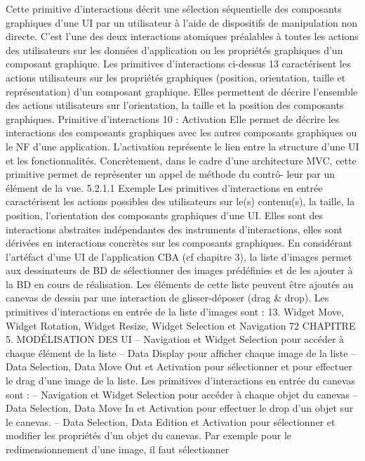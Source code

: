 \documentclass{article}
\begin{document}
Cette primitive d’interactions décrit une sélection séquentielle des composants graphiques d’une UI
par un utilisateur à l’aide de dispositifs de manipulation non directe. C’est l’une des deux interactions
atomiques préalables à toutes les actions des utilisateurs sur les données d’application ou les propriétés
graphiques d’un composant graphique.
Les primitives d’interactions ci-dessus 13 caractérisent les actions utilisateurs sur les propriétés
graphiques (position, orientation, taille et représentation) d’un composant graphique. Elles permettent
de décrire l’ensemble des actions utilisateurs sur l’orientation, la taille et la position des composants
graphiques.
Primitive d’interactions 10 : Activation
Elle permet de décrire les interactions des composants graphiques avec les
autres composants graphiques ou le NF d’une application.
L’activation représente le lien entre la structure d’une UI et les fonctionnalités. Concrètement, dans le
cadre d’une architecture MVC, cette primitive permet de représenter un appel de méthode du contrô-
leur par un élément de la vue.
5.2.1.1
Exemple
Les primitives d’interactions en entrée caractérisent les actions possibles des utilisateurs sur le(s)
contenu(s), la taille, la position, l’orientation des composants graphiques d’une UI. Elles sont des
interactions abstraites indépendantes des instruments d’interactions, elles sont dérivées en interactions
concrètes sur les composants graphiques. En considérant l’artéfact d’une UI de l’application CBA (cf
chapitre 3), la liste d’images permet aux dessinateurs de BD de sélectionner des images prédéﬁnies
et de les ajouter à la BD en cours de réalisation. Les éléments de cette liste peuvent être ajoutés au
canevas de dessin par une interaction de glisser-déposer (drag & drop). Les primitives d’interactions
en entrée de la liste d’images sont :
13. Widget Move, Widget Rotation, Widget Resize, Widget Selection et Navigation
72
CHAPITRE 5. MODÉLISATION DES UI
– Navigation et Widget Selection pour accéder à chaque élément de la liste
– Data Display pour afﬁcher chaque image de la liste
– Data Selection, Data Move Out et Activation pour sélectionner et pour effectuer le drag d’une
image de la liste.
Les primitives d’interactions en entrée du canevas sont :
– Navigation et Widget Selection pour accéder à chaque objet du canevas
– Data Selection, Data Move In et Activation pour effectuer le drop d’un objet sur le canevas.
– Data Selection, Data Edition et Activation pour sélectionner et modiﬁer les propriétés d’un
objet du canevas. Par exemple pour le redimensionnement d’une image, il faut sélectionner
\end{document}
